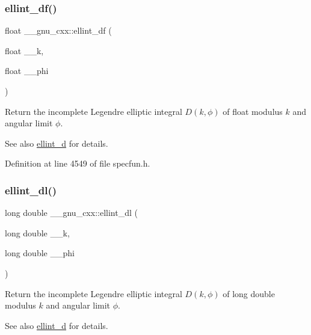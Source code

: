 \subsubsection{\texorpdfstring{ellint\+\_\+df()}{ellint\_df()}}
{\footnotesize\ttfamily float \+\_\+\+\_\+gnu\+\_\+cxx\+::ellint\+\_\+df (\begin{DoxyParamCaption}\item[{float}]{\+\_\+\+\_\+k,  }\item[{float}]{\+\_\+\+\_\+phi }\end{DoxyParamCaption})\hspace{0.3cm}{\ttfamily [inline]}}

Return the incomplete Legendre elliptic integral $ D(k, \phi) $ of {\ttfamily float} modulus $ k $ and angular limit $ \phi $.

\begin{DoxySeeAlso}{See also}
\hyperlink{group__gnu__math__spec__func_gad75103894786e6d7766bac4d8447b6cc}{ellint\+\_\+d} for details. 
\end{DoxySeeAlso}


Definition at line 4549 of file specfun.\+h.

\mbox{\label{group__gnu__math__spec__func_gaa34bcb8e316f2e8b2b2bf48cd89abd98}} 
\subsubsection{\texorpdfstring{ellint\+\_\+dl()}{ellint\_dl()}}
{\footnotesize\ttfamily long double \+\_\+\+\_\+gnu\+\_\+cxx\+::ellint\+\_\+dl (\begin{DoxyParamCaption}\item[{long double}]{\+\_\+\+\_\+k,  }\item[{long double}]{\+\_\+\+\_\+phi }\end{DoxyParamCaption})\hspace{0.3cm}{\ttfamily [inline]}}

Return the incomplete Legendre elliptic integral $ D(k, \phi) $ of {\ttfamily long double} modulus $ k $ and angular limit $ \phi $.

\begin{DoxySeeAlso}{See also}
\hyperlink{group__gnu__math__spec__func_gad75103894786e6d7766bac4d8447b6cc}{ellint\+\_\+d} for details. 
\end{DoxySeeAlso}



